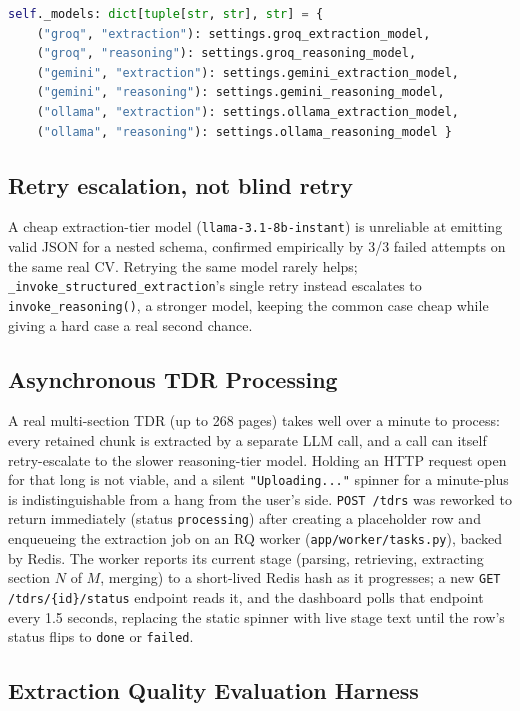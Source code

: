 \begin{lstlisting}[language=Python]
self._models: dict[tuple[str, str], str] = {
    ("groq", "extraction"): settings.groq_extraction_model,
    ("groq", "reasoning"): settings.groq_reasoning_model,
    ("gemini", "extraction"): settings.gemini_extraction_model,
    ("gemini", "reasoning"): settings.gemini_reasoning_model,
    ("ollama", "extraction"): settings.ollama_extraction_model,
    ("ollama", "reasoning"): settings.ollama_reasoning_model }
\end{lstlisting}

\subsection{Retry escalation, not blind retry}

A cheap extraction-tier model (\texttt{llama-3.1-8b-instant}) is
unreliable at emitting valid JSON for a nested schema, confirmed
empirically by 3/3 failed attempts on the same real CV. Retrying the same
model rarely helps; \texttt{\_invoke\_structured\_extraction}'s single
retry instead escalates to \texttt{invoke\_reasoning()}, a stronger model,
keeping the common case cheap while giving a hard case a real second
chance.

\subsection{Asynchronous TDR Processing}

A real multi-section TDR (up to 268 pages) takes well over a minute to
process: every retained chunk is extracted by a separate LLM call, and a
call can itself retry-escalate to the slower reasoning-tier model. Holding
an HTTP request open for that long is not viable, and a silent
\texttt{"Uploading..."} spinner for a minute-plus is indistinguishable from
a hang from the user's side. \texttt{POST /tdrs} was reworked to return
immediately (status \texttt{processing}) after creating a placeholder row
and enqueueing the extraction job on an RQ worker
(\texttt{app/worker/tasks.py}), backed by Redis. The worker reports its
current stage (parsing, retrieving, extracting section $N$ of $M$, merging)
to a short-lived Redis hash as it progresses; a new
\texttt{GET /tdrs/\{id\}/status} endpoint reads it, and the dashboard polls
that endpoint every 1.5 seconds, replacing the static spinner with live
stage text until the row's status flips to \texttt{done} or \texttt{failed}.

\subsection{Extraction Quality Evaluation Harness}

